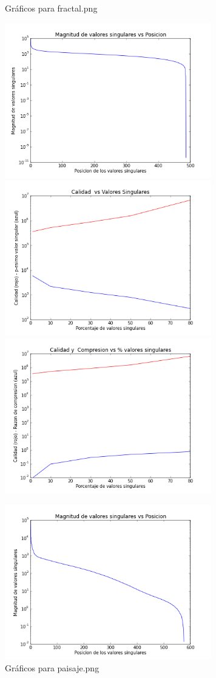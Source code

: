 \documentclass[spanish, fleqn]{article}
\begin{document}
	\begin{figure}[htbp]
		\begin{minipage}[b]{0.5\linewidth}
			\caption{Gráficos para fractal.png}
			\includegraphics[width=90mm]{./Graficos/fractal-svalue}
			\includegraphics[width=90mm]{./Graficos/fractal-quality}
			\includegraphics[width=90mm]{./Graficos/fractal-size}
			\label{fig:figura1}
		\end{minipage}%
		\begin{minipage}[b]{0.5\linewidth}
			\caption{Gráficos para paisaje.png}
			\includegraphics[width=90mm]{./Graficos/paisaje-svalue}

\end{minipage}
\end{figure}
\end{document}
